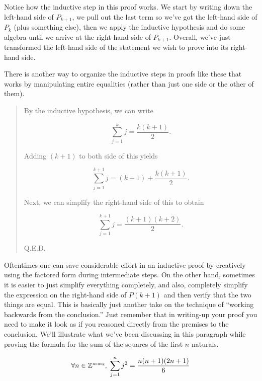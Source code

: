 Notice how the inductive step in this proof works.  We start by writing
down the left-hand side of $P_{k+1}$, we pull out the last term
so we've got the left-hand side of $P_{k}$ (plus something else), then
we apply the inductive hypothesis and do some algebra until we arrive
at the right-hand side of $P_{k+1}$.  Overall, we've just transformed the
left-hand side of the statement we wish to prove into its right-hand side.

There is another way to organize the inductive steps in proofs like these
that works by manipulating entire equalities (rather than just one side
or the other of them).

\begin{quote}

  By the inductive 
hypothesis, we can write

\[ \sum_{j=1}^{k} j = \frac{k(k+1)}{2}. \]

Adding $(k+1)$ to both side of this yields

\[ \sum_{j=1}^{k+1} j = (k+1) + \frac{k(k+1)}{2}. \]

Next, we can simplify the right-hand side of this to obtain

\[ \sum_{j=1}^{k+1} j = \frac{(k+1)(k+2)}{2}. \]

\rule{0pt}{0pt} \hspace{\fill} Q.E.D.
\end{quote}
\medskip

Oftentimes one can save considerable effort in an inductive 
proof by creatively using the factored form during intermediate steps.
On the other hand, sometimes it is easier to just simplify everything
completely, and also, completely simplify the expression on the 
right-hand side of $P(k+1)$ and then verify that the two things are
equal.  This is basically just another take on the technique of 
``working backwards from the conclusion.''  Just remember that 
in writing-up your proof you need to make it look as if you reasoned
directly from the premises to the conclusion.  We'll illustrate
what we've been discussing in this paragraph while proving
the formula for the sum of the squares of the first $n$ naturals.

\begin{thm}
\[ \forall n \in {\mathbb Z}^{\mbox{\tiny noneg}}, \; \sum_{j=1}^n j^2 = \frac{n(n+1)(2n+1)}{6} \]
\end{thm}

